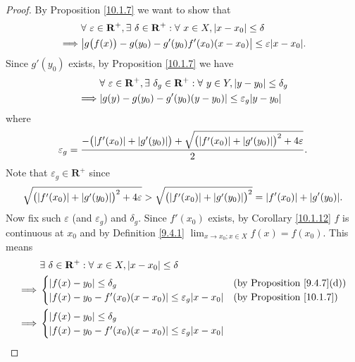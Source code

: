 \begin{proof}
    By Proposition \ref{10.1.7} we want to show that
    \begin{align*}
                 & \forall\ \varepsilon \in \mathbf{R}^+, \exists\ \delta \in \mathbf{R}^+ : \forall\ x \in X, \abs*{x - x_0} \leq \delta \\
        \implies & \abs*{g\big(f(x)\big) - g(y_0) - g'(y_0) f'(x_0) (x - x_0)} \leq \varepsilon \abs*{x - x_0}.
    \end{align*}
    Since \(g'(y_0)\) exists, by Proposition \ref{10.1.7} we have
    \begin{align*}
                 & \forall\ \varepsilon \in \mathbf{R}^+, \exists\ \delta_g \in \mathbf{R}^+ : \forall\ y \in Y, \abs*{y - y_0} \leq \delta_g \\
        \implies & \abs*{g(y) - g(y_0) - g'(y_0) (y - y_0)} \leq \varepsilon_g \abs*{y - y_0}
    \end{align*}
    where
    \[
        \varepsilon_g = \frac{-\big(\abs*{f'(x_0)} + \abs*{g'(y_0)}\big) + \sqrt{\big(\abs*{f'(x_0)} + \abs*{g'(y_0)}\big)^2 + 4 \varepsilon}}{2}.
    \]
    Note that \(\varepsilon_g \in \mathbf{R}^+\) since
    \[
        \sqrt{\big(\abs*{f'(x_0)} + \abs*{g'(y_0)}\big)^2 + 4 \varepsilon} > \sqrt{\big(\abs*{f'(x_0)} + \abs*{g'(y_0)}\big)^2} = \abs*{f'(x_0)} + \abs*{g'(y_0)}.
    \]
    Now fix such \(\varepsilon\) (and \(\varepsilon_g\)) and \(\delta_g\).
    Since \(f'(x_0)\) exists, by Corollary \ref{10.1.12} \(f\) is continuous at \(x_0\) and by Definition \ref{9.4.1} \(\lim_{x \to x_0 ; x \in X} f(x) = f(x_0)\).
    This means
    \begin{align*}
                 & \exists\ \delta \in \mathbf{R}^+ : \forall\ x \in X, \abs*{x - x_0} \leq \delta \\
        \implies & \begin{cases}
            \abs*{f(x) - y_0} \leq \delta_g                                         & \text{(by Proposition \ref{9.4.7}(d))} \\
            \abs*{f(x) - y_0 - f'(x_0) (x - x_0)} \leq \varepsilon_g \abs*{x - x_0} & \text{(by Proposition \ref{10.1.7})}
        \end{cases}                                                      \\
        \implies & \begin{cases}
            \abs*{f(x) - y_0} \leq \delta_g                                         \\
            \abs*{f(x) - y_0 - f'(x_0) (x - x_0)} \leq \varepsilon_g \abs*{x - x_0} \\

\end{cases}
\end{align*}
\end{proof}
